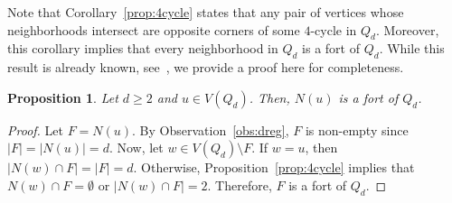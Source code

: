 \documentclass[twoside, 12pt]{article}
\newtheorem{proposition}[theorem]{Proposition}
\theoremstyle{definition}
\newcommand\abs[1]{\left|#1\right|}
\begin{document}
Note that Corollary~\ref{prop:4cycle} states that any pair of vertices whose neighborhoods intersect are opposite corners of some $4$-cycle in $Q_{d}$. 
Moreover, this corollary implies that every neighborhood in $Q_{d}$ is a fort of $Q_{d}$.
While this result is already known, see~\cite[Proposition 3.15]{Cameron2023}, we provide a proof here for completeness. 
\begin{proposition}\label{prop:nbhd_fort}
Let $d\geq 2$ and $u\in V(Q_{d})$.
Then, $N(u)$ is a fort of $Q_{d}$.
\end{proposition}
\begin{proof}
Let $F=N(u)$.
By Observation~\ref{obs:dreg}, $F$ is non-empty since $\abs{F}=\abs{N(u)}=d$.
Now, let $w\in V(Q_{d})\setminus{F}$.
If $w=u$, then $\abs{N(w)\cap F}=\abs{F}=d$. 
Otherwise, Proposition~\ref{prop:4cycle} implies that $N(w)\cap F=\emptyset$ or $\abs{N(w)\cap F}=2$.
Therefore, $F$ is a fort of $Q_{d}$.
\end{proof}
\end{document}
